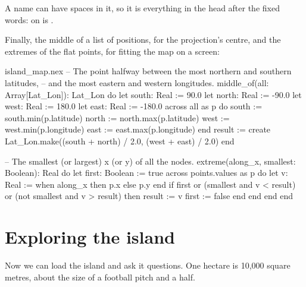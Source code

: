 A name can have spaces in it, so it is everything in the head after the
fixed words:  on
 is .

Finally, the middle of a list of positions, for the projection's centre,
and the extremes of the flat points, for fitting the map on a screen:

\begin{continued}{island_map.nex}
  -- The point halfway between the most northern and southern latitudes,
  -- and the most eastern and western longitudes.
  middle_of(all: Array[Lat_Lon]): Lat_Lon do
    let south: Real := 90.0
    let north: Real := -90.0
    let west: Real := 180.0
    let east: Real := -180.0
    across all as p do
      south := south.min(p.latitude)
      north := north.max(p.latitude)
      west := west.min(p.longitude)
      east := east.max(p.longitude)
    end
    result := create Lat_Lon.make((south + north) / 2.0, (west + east) / 2.0)
  end

  -- The smallest (or largest) x (or y) of all the nodes.
  extreme(along_x, smallest: Boolean): Real do
    let first: Boolean := true
    across points.values as p do
      let v: Real := when along_x then p.x else p.y end
      if first or (smallest and v < result) or (not smallest and v > result) then
        result := v
        first := false
      end
    end
  end
end
\end{continued}

\section{Exploring the island}

Now we can load the island and ask it questions. One hectare is
10,000 square metres, about the size of a football pitch and a half.

